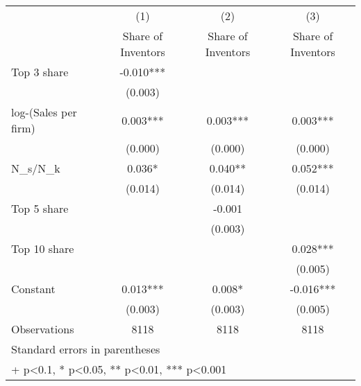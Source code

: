 {
\def\sym#1{\ifmmode^{#1}\else\(^{#1}\)\fi}
\begin{tabular}{l*{3}{c}}
\hline\hline
                    &\multicolumn{1}{c}{(1)}&\multicolumn{1}{c}{(2)}&\multicolumn{1}{c}{(3)}\\
                    &\multicolumn{1}{c}{Share of Inventors}&\multicolumn{1}{c}{Share of Inventors}&\multicolumn{1}{c}{Share of Inventors}\\
\hline
Top 3 share         &      -0.010***&               &               \\
                    &     (0.003)   &               &               \\
[1em]
log-(Sales per firm)&       0.003***&       0.003***&       0.003***\\
                    &     (0.000)   &     (0.000)   &     (0.000)   \\
[1em]
N\_s/N\_k             &       0.036*  &       0.040** &       0.052***\\
                    &     (0.014)   &     (0.014)   &     (0.014)   \\
[1em]
Top 5 share         &               &      -0.001   &               \\
                    &               &     (0.003)   &               \\
[1em]
Top 10 share        &               &               &       0.028***\\
                    &               &               &     (0.005)   \\
[1em]
Constant            &       0.013***&       0.008*  &      -0.016***\\
                    &     (0.003)   &     (0.003)   &     (0.005)   \\
\hline
Observations        &        8118   &        8118   &        8118   \\
\hline\hline
\multicolumn{4}{l}{\footnotesize Standard errors in parentheses}\\
\multicolumn{4}{l}{\footnotesize + p<0.1, * p<0.05, ** p<0.01, *** p<0.001}\\
\end{tabular}
}

